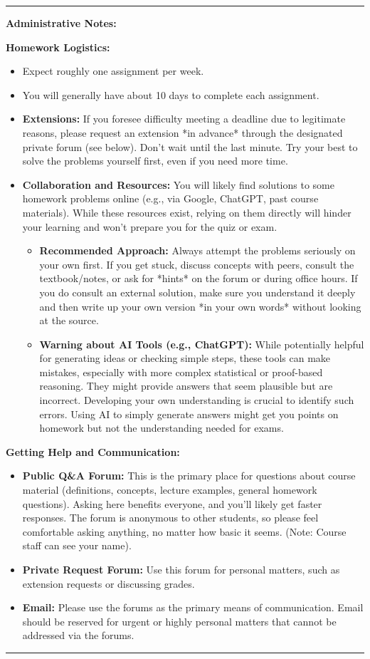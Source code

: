 \documentclass[11pt]{article}
\theoremstyle{definition}
\theoremstyle{remark}
\newenvironment{adminnote}{%
  \par\medskip\noindent\rule{\linewidth}{0.4pt}\par\nobreak\medskip%
  \noindent\textbf{Administrative Notes:}\par\nobreak\smallskip%
}
{%
  \par\medskip\noindent\rule{\linewidth}{0.4pt}\par\nobreak\medskip%
}
\begin{document}
\begin{adminnote}
\textbf{Homework Logistics:}
\begin{itemize}
    \item Expect roughly one assignment per week.
    \item You will generally have about 10 days to complete each assignment.
    \item \textbf{Extensions:} If you foresee difficulty meeting a deadline due to legitimate reasons, please request an extension *in advance* through the designated private forum (see below). Don't wait until the last minute. Try your best to solve the problems yourself first, even if you need more time.
    \item \textbf{Collaboration and Resources:} You will likely find solutions to some homework problems online (e.g., via Google, ChatGPT, past course materials). While these resources exist, relying on them directly will hinder your learning and won't prepare you for the quiz or exam.
        \begin{itemize}
            \item \textbf{Recommended Approach:} Always attempt the problems seriously on your own first. If you get stuck, discuss concepts with peers, consult the textbook/notes, or ask for *hints* on the forum or during office hours. If you do consult an external solution, make sure you understand it deeply and then write up your own version *in your own words* without looking at the source.
            \item \textbf{Warning about AI Tools (e.g., ChatGPT):} While potentially helpful for generating ideas or checking simple steps, these tools can make mistakes, especially with more complex statistical or proof-based reasoning. They might provide answers that seem plausible but are incorrect. Developing your own understanding is crucial to identify such errors. Using AI to simply generate answers might get you points on homework but not the understanding needed for exams.
        \end{itemize}
\end{itemize}

\textbf{Getting Help and Communication:}
\begin{itemize}
    \item \textbf{Public Q\&A Forum:} This is the primary place for questions about course material (definitions, concepts, lecture examples, general homework questions). Asking here benefits everyone, and you'll likely get faster responses. The forum is anonymous to other students, so please feel comfortable asking anything, no matter how basic it seems. (Note: Course staff can see your name).
    \item \textbf{Private Request Forum:} Use this forum for personal matters, such as extension requests or discussing grades.
    \item \textbf{Email:} Please use the forums as the primary means of communication. Email should be reserved for urgent or highly personal matters that cannot be addressed via the forums.
\end{itemize}
\end{adminnote}
\end{document}
